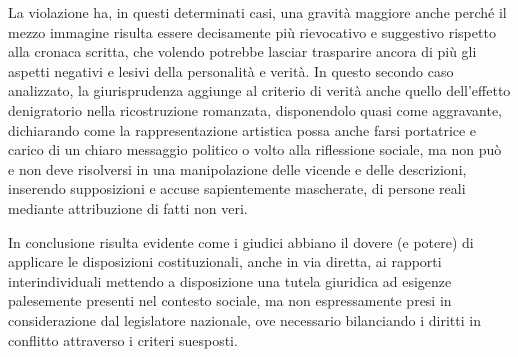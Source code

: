 La violazione ha, in questi determinati casi, una gravità maggiore anche perché il mezzo immagine risulta essere decisamente più rievocativo e suggestivo rispetto alla cronaca scritta, che volendo potrebbe lasciar trasparire ancora di più gli aspetti negativi e lesivi della personalità e verità.
In questo secondo caso analizzato, la giurisprudenza aggiunge al criterio di verità anche quello dell'effetto denigratorio nella ricostruzione romanzata, disponendolo quasi come aggravante, dichiarando come la rappresentazione artistica possa anche farsi portatrice e carico di un chiaro messaggio politico o volto alla riflessione sociale, ma non può e non deve risolversi in una manipolazione delle vicende e delle descrizioni, inserendo supposizioni e accuse sapientemente mascherate, di persone reali mediante attribuzione di fatti non veri.

In conclusione risulta evidente come i giudici abbiano il dovere (e potere) di applicare le disposizioni costituzionali, anche in via diretta, ai rapporti interindividuali mettendo a disposizione una tutela giuridica ad esigenze palesemente presenti nel contesto sociale, ma non espressamente presi in considerazione dal legislatore nazionale, ove necessario bilanciando i diritti in conflitto attraverso i criteri suesposti.

